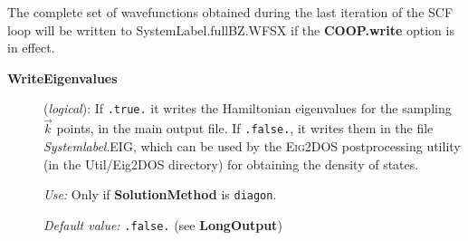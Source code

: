 The complete set of wavefunctions obtained during the last
iteration of the SCF loop will be written to SystemLabel.fullBZ.WFSX
if the \textbf{COOP.write} option is in effect.

\begin{description}
\item[\textbf{WriteEigenvalues}] (\textit{logical}):
If \texttt{.true.} it writes the Hamiltonian eigenvalues for the sampling
$\vec k$ points, in the main output file.
If \texttt{.false.}, it writes them in the file \textit{Systemlabel}.EIG,
which can be used by the \textsc{Eig2DOS} postprocessing
utility (in the Util/Eig2DOS directory) for obtaining the density of
states.

\textit{Use:} Only if \textbf{SolutionMethod} is \texttt{diagon}.

\textit{Default value:} \texttt{.false.} (see \textbf{LongOutput})

\end{description}


